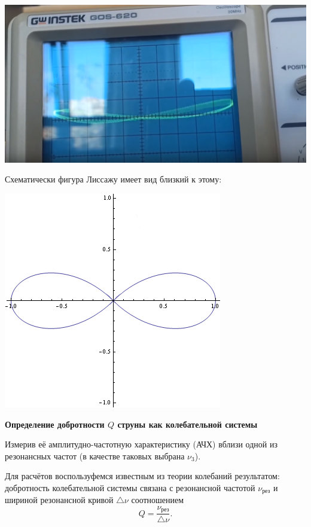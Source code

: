 \documentclass[a4paper,12pt]{article} %
\begin{document}
\begin{center}
\includegraphics[scale=0.6]{1.4.5 7}
\end{center}

Схематически фигура Лиссажу имеет вид близкий к этому:

\begin{center}
\includegraphics[scale=0.85]{1.4.5 8}
\end{center}

{\bf Определение добротности $Q$ струны как колебательной системы}

Измерив её амплитудно-частотную характеристику (АЧХ) вблизи одной из резонансных частот (в качестве таковых выбрана $\nu_3$).

Для расчётов воспользуфемся известным из теории колебаний результатом:
добротность колебательной системы связана с резонансной частотой $\nu_{\textbf{рез}}$ и шириной резонансной кривой $\bigtriangleup \nu$ соотношением \[ Q = \frac{\nu_{\textbf{рез}}}{\bigtriangleup \nu} . \]
\end{document}
